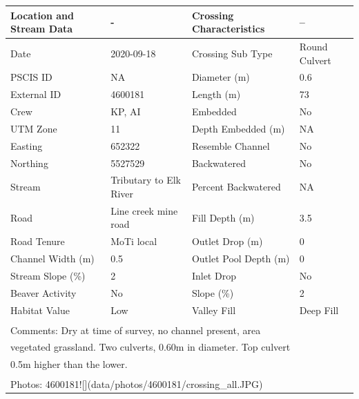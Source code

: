 \documentclass[
]{book}
\begin{document}
\begin{tabular}{l|l|l|l}
\hline
Location and Stream Data & - & Crossing Characteristics & --\\
\hline
Date & 2020-09-18 & Crossing Sub Type & Round Culvert\\
\hline
PSCIS ID & NA & Diameter (m) & 0.6\\
\hline
External ID & 4600181 & Length (m) & 73\\
\hline
Crew & KP, AI & Embedded & No\\
\hline
UTM Zone & 11 & Depth Embedded (m) & NA\\
\hline
Easting & 652322 & Resemble Channel & No\\
\hline
Northing & 5527529 & Backwatered & No\\
\hline
Stream & Tributary to Elk River & Percent Backwatered & NA\\
\hline
Road & Line creek mine road & Fill Depth (m) & 3.5\\
\hline
Road Tenure & MoTi local & Outlet Drop (m) & 0\\
\hline
Channel Width (m) & 0.5 & Outlet Pool Depth (m) & 0\\
\hline
Stream Slope (\%) & 2 & Inlet Drop & No\\
\hline
Beaver Activity & No & Slope (\%) & 2\\
\hline
Habitat Value & Low & Valley Fill & Deep Fill\\
\hline
\multicolumn{4}{l}{\textsuperscript{} Comments: Dry at time of survey, no channel present, area}\\
\multicolumn{4}{l}{vegetated grassland. Two culverts, 0.60m in diameter. Top culvert}\\
\multicolumn{4}{l}{0.5m higher than the lower.}\\
\multicolumn{4}{l}{\textsuperscript{} Photos: 4600181![](data/photos/4600181/crossing\_all.JPG)}\\
\end{tabular}
\end{document}
